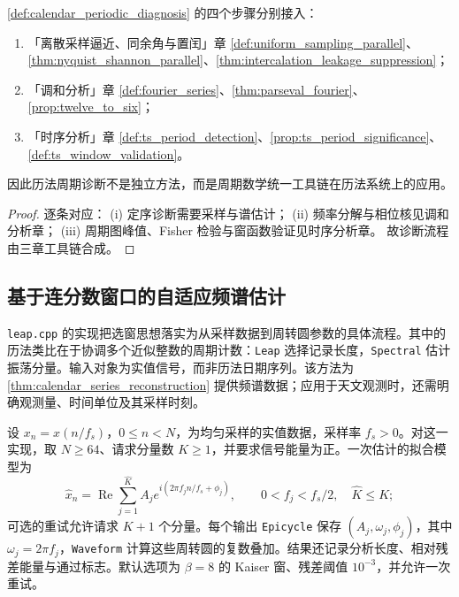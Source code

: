 \begin{theorem}[历法周期诊断流程与三章接口]\label{thm:calendar_diagnosis_integration}
\cref{def:calendar_periodic_diagnosis} 的四个步骤分别接入：
\begin{enumerate}[label=(\roman*)]
    \item 「离散采样逼近、同余角与置闰」章 \cref{def:uniform_sampling_parallel}、\cref{thm:nyquist_shannon_parallel}、\cref{thm:intercalation_leakage_suppression}；
    \item 「调和分析」章 \cref{def:fourier_series}、\cref{thm:parseval_fourier}、\cref{prop:twelve_to_six}；
    \item 「时序分析」章 \cref{def:ts_period_detection}、\cref{prop:ts_period_significance}、\cref{def:ts_window_validation}。
\end{enumerate}
因此历法周期诊断不是独立方法，而是周期数学统一工具链在历法系统上的应用。
\end{theorem}

\begin{proof}
逐条对应：
(i) 定序诊断需要采样与谱估计；
(ii) 频率分解与相位核见调和分析章；
(iii) 周期图峰值、Fisher 检验与窗函数验证见时序分析章。
故诊断流程由三章工具链合成。
\end{proof}

\subsection{基于连分数窗口的自适应频谱估计}
\label{sec:calendar_leap_spectral}

\texttt{leap.cpp} 的实现把选窗思想落实为从采样数据到周转圆参数的具体流程。其中的历法类比在于协调多个近似整数的周期计数：\texttt{Leap} 选择记录长度，\texttt{Spectral} 估计振荡分量。输入对象为实值信号，而非历法日期序列。该方法为 \cref{thm:calendar_series_reconstruction} 提供频谱数据；应用于天文观测时，还需明确观测量、时间单位及其采样时刻。

\begin{definition}[估计器的输入与周转圆表示]\label{def:calendar_leap_input}
设 \(x_n=x(n/f_s)\)，\(0\le n<N\)，为均匀采样的实值数据，采样率 \(f_s>0\)。对这一实现，取 \(N\ge64\)、请求分量数 \(K\ge1\)，并要求信号能量为正。一次估计的拟合模型为
\[
\widehat x_n=\operatorname{Re}\sum_{j=1}^{\widehat K}
 A_j e^{i(2\pi f_j n/f_s+\phi_j)},\qquad
0<f_j<f_s/2,\quad \widehat K\le K;
\]
可选的重试允许请求 \(K+1\) 个分量。每个输出 \texttt{Epicycle} 保存 \((A_j,\omega_j,\phi_j)\)，其中 \(\omega_j=2\pi f_j\)，\texttt{Waveform} 计算这些周转圆的复数叠加。结果还记录分析长度、相对残差能量与通过标志。默认选项为 \(\beta=8\) 的 Kaiser 窗、残差阈值 \(10^{-3}\)，并允许一次重试。
\end{definition}

